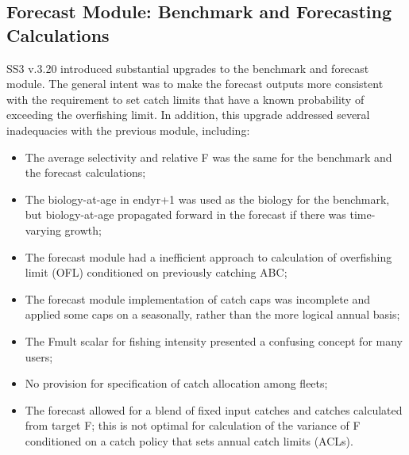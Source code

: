 \hypertarget{appendB}{}
\subsection{Forecast Module: Benchmark and Forecasting Calculations}
\label{sec:forecast}

SS3 v.3.20 introduced substantial upgrades to the benchmark and forecast module. The general intent was to make the forecast outputs more consistent with the requirement to set catch limits that have a known probability of exceeding the overfishing limit. In addition, this upgrade addressed several inadequacies with the previous module, including:

\begin{itemize}
	\item The average selectivity and relative F was the same for the benchmark and the forecast calculations;
	\item The biology-at-age in endyr+1 was used as the biology for the benchmark, but biology-at-age propagated forward in the forecast if there was time-varying growth;
	\item The forecast module had a inefficient approach to calculation of overfishing limit (OFL) conditioned on previously catching ABC;
	\item The forecast module implementation of catch caps was incomplete and applied some caps on a seasonally, rather than the more logical annual basis;
	\item The Fmult scalar for fishing intensity presented a confusing concept for many users;
	\item No provision for specification of catch allocation among fleets;
	\item The forecast allowed for a blend of fixed input catches and catches calculated from target F; this is not optimal for calculation of the variance of F conditioned on a catch policy that sets annual catch limits (ACLs).
\end{itemize}

